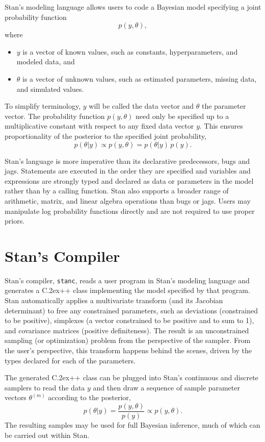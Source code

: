 \documentclass[10pt]{report}
\newcommand{\Stan}{Stan\xspace}
\newcommand{\stanc}{{\tt stanc}\xspace}
\newcommand*{\Cpp}{C\raise.2ex\hbox{\footnotesize ++}\xspace} %
\newcommand{\acronym}[1]{{\sc #1}\xspace}
\newcommand{\BUGS}{\acronym{bugs}}
\newcommand{\JAGS}{\acronym{jags}}
\begin{document}
\Stan's modeling language allows users to code a Bayesian model
specifying a joint probability function
\[
p(y,\theta),
\]
where 
\begin{itemize}
\item
  $y$ is a vector of known values, such as 
  constants, hyperparameters, and modeled data, and
\item
 $\theta$ is a vector of unknown values, such as estimated parameters,
  missing data, and simulated values.
\end{itemize}
%
To simplify terminology, $y$ will be called the data vector and
$\theta$ the parameter vector.  The probability function $p(y,\theta)$
need only be specified up to a multiplicative constant with respect to
any fixed data vector $y$.  This ensures proportionality of the
posterior to the specified joint probability,
\[
p(\theta|y) \propto p(y,\theta) = p(\theta|y) \, p(y).
\]

Stan's language is more imperative than its declarative 
predecessors, \BUGS and \JAGS.  Statements are executed in the order 
they are specified and variables and expressions are strongly typed 
and declared as data or parameters in the model rather than by a 
calling function.  Stan also supports a broader range of arithmetic, 
matrix, and linear algebra operations than \BUGS or \JAGS.  Users may 
manipulate log probability functions directly and are not required 
to use proper priors.

\section{\Stan's Compiler}

\Stan's compiler, \stanc, reads a user program in \Stan's modeling
language and generates a \Cpp class implementing the model specified
by that program.  \Stan automatically applies a multivariate transform
(and its Jacobian determinant) to free any constrained parameters,
such as deviations (constrained to be positive), simplexes (a vector
constrained to be positive and to sum to 1), and covariance matrices
(positive definiteness).  The result is an unconstrained sampling (or
optimization) problem from the perspective of the sampler.  From the
user's perspective, this transform happens behind the scenes, driven
by the types declared for each of the parameters.

The generated \Cpp class can be plugged into Stan's continuous and
discrete samplers to read the data $y$ and then draw a sequence of
sample parameter vectors $\theta^{(m)}$ according to the posterior,
\[
p(\theta|y) = \frac{p(y,\theta)}{p(y)} \propto p(y,\theta).
\]
The resulting samples may be used for full Bayesian inference, much of
which can be carried out within Stan.
\end{document}
